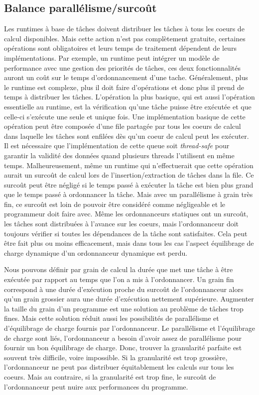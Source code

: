 \subsection{Balance parallélisme/surcoût}
Les runtimes à base de tâches doivent distribuer les tâches à tous les coeurs de calcul disponibles.
%
Mais cette action n'est pas complètement gratuite, certaines opérations sont obligatoires et leurs temps de traitement dépendent de leurs implémentations.
%
Par exemple, un runtime peut intégrer un modèle de performance avec une gestion des priorités de tâches, ces deux fonctionnalités auront un coût sur le temps d'ordonnancement d'une tache.
%
Généralement, plus le runtime est complexe, plus il doit faire d'opérations et donc plus il prend de temps à distribuer les tâches.
%
L'opération la plus basique, qui est aussi l'opération essentielle au runtime, est la vérification qu'une tâche puisse être exécutée et que celle-ci s'exécute une seule et unique fois.
%
Une implémentation basique de cette opération peut être composée d'une file partagée par tous les coeurs de calcul dans laquelle les tâches sont enfilées dès qu'un coeur de calcul peut les exécuter.
%
Il est nécessaire que l'implémentation de cette queue soit {\em thread-safe} pour garantir la validité des données quand plusieurs threads l'utilisent en même temps.
%
Malheureusement, même un runtime qui n'effectuerait que cette opération aurait un surcoût de calcul lors de l'insertion/extraction de tâches dans la file.
%
Ce surcoût peut être négligé si le temps passé à exécuter la tâche est bien plus grand que le temps passé à ordonnancer la tâche.
%
Mais avec un parallélisme à grain très fin, ce surcoût est loin de pouvoir être considéré comme négligeable et le programmeur doit faire avec.
%
Même les ordonnanceurs statiques ont un surcoût, les tâches sont distribuées à l'avance sur les coeurs, mais l'ordonnanceur doit toujours vérifier si toutes les dépendances de la tâche sont satisfaites.
%
Cela peut être fait plus ou moins efficacement, mais dans tous les cas l'aspect équilibrage de charge dynamique d'un ordonnanceur dynamique est perdu\cite{static_sched}.

Nous pouvons définir par grain de calcul la durée que met une tâche à être exécutée par rapport au temps que l'on a mis à l'ordonnancer.
%
Un grain fin correspond à une durée d'exécution proche du surcoût de l'ordonnanceur alors qu'un grain grossier aura une durée d'exécution nettement supérieure.
%
Augmenter la taille du grain d'un programme est une solution au problème de tâches trop fines.
%
Mais cette solution réduit aussi les possibilités de parallélisme et d'équilibrage de charge fournis par l'ordonnanceur.
%
Le parallélisme et l'équilibrage de charge sont liés, l'ordonnanceur a besoin d'avoir assez de parallélisme pour fournir un bon équilibrage de charge.
%
Donc, trouver la granularité parfaite est souvent très difficile, voire impossible.
%
Si la granularité est trop grossière, l'ordonnanceur ne peut pas distribuer équitablement les calculs sur tous les coeurs.
%
Mais au contraire, si la granularité est trop fine, le surcoût de l'ordonnanceur peut nuire aux performances du programme.

